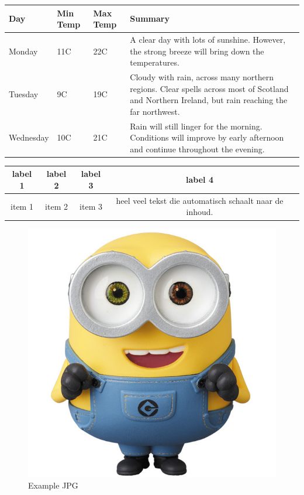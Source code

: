 \begin{center}
    \begin{tabular}{ l  l  l  p{5cm}}
    \hline
    Day & Min Temp & Max Temp & Summary \\ \hline
    Monday & 11C & 22C & A clear day with lots of sunshine.  
    However, the strong breeze will bring down the temperatures. \\ \hline
    Tuesday & 9C & 19C & Cloudy with rain, across many northern regions. Clear spells 
    across most of Scotland and Northern Ireland, 
    but rain reaching the far northwest. \\ \hline
    Wednesday & 10C & 21C & Rain will still linger for the morning. 
    Conditions will improve by early afternoon and continue 
    throughout the evening. \\
    \hline
    \end{tabular}
\end{center}







%

\begin{tabularx}{\textwidth}{ ccccX }
  \hline
  label 1 & label 2 & label 3 & label 4 \\
  \hline 
  item 1  & item 2  & item 3  & heel veel tekst die automatisch schaalt naar de inhoud.  \\
  \hline
\end{tabularx}



\begin{figure}
    \centering
    \includegraphics[width=0.95\linewidth]{masterproef_template_dramco/figs/example.jpg}
    \caption{Example JPG}%
    \label{fig:example}
\end{figure}
 
